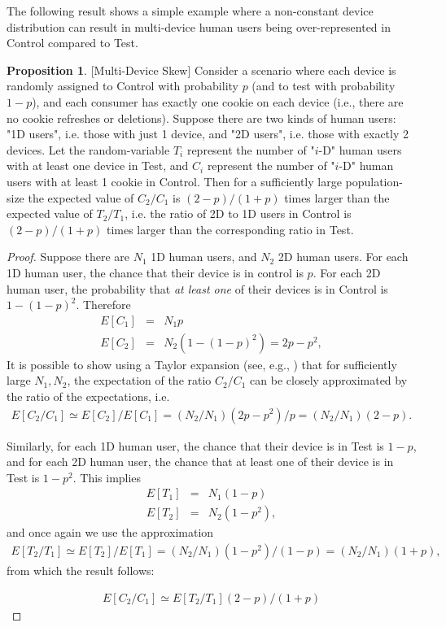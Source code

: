 \documentclass[11pt,a4paper]{article}
\theoremstyle{definition}
\theoremstyle{remark}
\theoremstyle{definition}
\theoremstyle{definition}
\theoremstyle{definition}
\theoremstyle{definition}
\theoremstyle{definition}
\theoremstyle{definition}
\newtheorem{proposition}[theorem]{Proposition}
\begin{document}
The following result shows a simple example where a non-constant device distribution can result in multi-device human users being over-represented in Control compared to Test.
\begin{proposition}\small [Multi-Device Skew] \label{prop-md-skew}
Consider a scenario where each device is randomly assigned to Control with probability $p$ (and to test with probability $1-p$), and each consumer has exactly one cookie on each device (i.e., there are no cookie refreshes or deletions). Suppose there are two kinds of human users: "1D users", i.e. those with just 1 device, and "2D users", i.e. those with exactly 2 devices. Let the random-variable $T_i$ represent the number of "$i$-D" human users with at least one device in Test, and $C_i$ represent the number of "$i$-D" human users with at least 1 cookie in Control. Then for a sufficiently large population-size the expected value of $C_2/C_1$ is $(2-p)/(1+p)$ times larger than the expected value of $T_2/T_1$, i.e. the ratio of 2D to 1D users in Control is $(2-p)/(1+p)$ times larger than the corresponding ratio in Test.
\end{proposition}
\begin{proof}\small
Suppose there are $N_1$ 1D human users, and $N_2$ 2D human users.
For each 1D human user, the chance that their device is in control is $p$. For each 2D human user, the probability that \textit{at least one} of their devices is in Control is $1 - (1-p)^2$. Therefore 
\begin{eqnarray*}
	E[C_1] &=& N_1 p\\
	E[C_2] &=& N_2 (1 - (1-p)^2) = 2p - p^2,
\end{eqnarray*}
It is possible to show using a Taylor expansion (see, e.g., \cite{taylor-stack-exchange})
that for sufficiently large $N_1, N_2$, the expectation of the ratio $C_2/C_1$ can be closely approximated by the ratio of the expectations, i.e. 
\begin{eqnarray*}
E[C_2/C_1] \simeq E[C_2]/E[C_1] = (N_2/N_1)(2p-p^2)/p = (N_2/N_1)(2-p).	
\end{eqnarray*}

Similarly, for each 1D human user, the chance that their device is in Test is $1-p$, and for each 2D human user, the chance that at least one of their device is in Test is $1 - p^2$. This implies
\begin{eqnarray*}
	E[T_1] &=& N_1 (1-p)\\
	E[T_2] &=& N_2 (1 - p^2),
\end{eqnarray*}
and once again we use the approximation
\begin{eqnarray*}
E[T_2/T_1] \simeq E[T_2]/E[T_1] = (N_2/N_1)(1-p^2)/(1-p) = (N_2/N_1)(1+p),
\end{eqnarray*}
from which the result follows:

\begin{eqnarray*}
E[C_2/C_1] \simeq E[T_2/T_1] (2-p)/(1+p)
\end{eqnarray*}

\end{proof}
\end{document}
